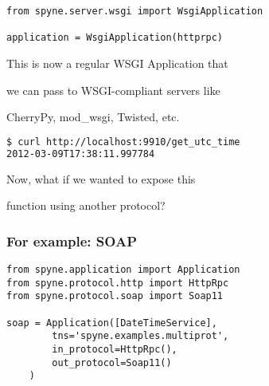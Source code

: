 \documentclass{beamer}
\begin{document}
\begin{frame}[fragile]
 \begin{lstlisting}
from spyne.server.wsgi import WsgiApplication

application = WsgiApplication(httprpc)
 \end{lstlisting}

  \begin{center}
    This is now a regular WSGI Application that

    \bigskip

    we can pass to WSGI-compliant servers like

    \bigskip

    CherryPy, mod\_wsgi, Twisted, etc.
  \end{center}
  \pause
  \begin{lstlisting}[language=sh]
$ curl http://localhost:9910/get_utc_time
2012-03-09T17:38:11.997784
  \end{lstlisting}
\end{frame}

\begin{frame}
  \LARGE
  \begin{center}
    Now, what if we wanted to expose this

    \bigskip

    function using another protocol?
  \end{center}
\end{frame}

\begin{frame}[fragile]
  \frametitle{For example: SOAP}

  \begin{lstlisting}
from spyne.application import Application
from spyne.protocol.http import HttpRpc
from spyne.protocol.soap import Soap11

soap = Application([DateTimeService],
        tns='spyne.examples.multiprot',
        in_protocol=HttpRpc(),
        out_protocol=Soap11()
    )
  \end{lstlisting}
\end{frame}
\end{document}
